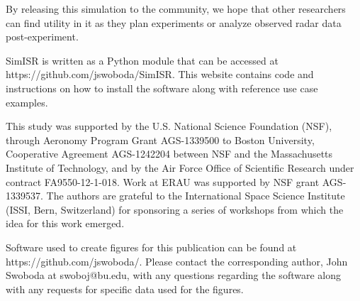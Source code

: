 \documentclass[draft,ras]{agutex}
\begin{document}
\begin{article}
By releasing this simulation to the community, we hope that other researchers can find utility in it as they plan experiments or analyze observed radar data post-experiment.

SimISR is written as a Python module that can be accessed at https://github.com/jswoboda/SimISR. This website contains code and instructions on how to install the software along with reference use case examples.
\begin{acknowledgments}
This study was supported by the U.S. National Science Foundation (NSF), through Aeronomy Program Grant AGS-1339500 to Boston University, Cooperative Agreement AGS-1242204 between NSF and the Massachusetts Institute of Technology, and by the Air Force Office of Scientific Research under contract FA9550-12-1-018.   Work at ERAU was supported by NSF grant AGS-1339537.  The authors are grateful to the International Space Science Institute (ISSI, Bern, Switzerland) for sponsoring a series of workshops from which the idea for this work emerged. 

Software used to create figures for this publication can be found at https://github.com/jswoboda/. Please contact the corresponding author, John Swoboda at swoboj@bu.edu, with any questions regarding the software along with any requests for specific data used for the figures. \end{acknowledgments}




\end{article}
\end{document}
